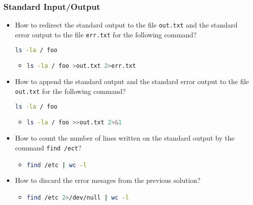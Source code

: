\begin{frame}[fragile]
\frametitle{Standard Input/Output}
	\begin{itemize}

		\item How to redirect the standard output to the file \texttt{out.txt} and 
			the standard error output to the file \texttt{err.txt} for the following command?
			
		\begin{small}	
\begin{lstlisting}[language=bash]		
ls -la / foo
\end{lstlisting}
		\end{small}		
		
		\begin{itemize}
			\item
\begin{lstlisting}[language=bash]		
ls -la / foo >out.txt 2>err.txt
\end{lstlisting}
		\end{itemize}

		\item How to append the standard output and the standard error output to the file \texttt{out.txt}  for the following command?
	
		\begin{small}		
\begin{lstlisting}[language=bash]		
ls -la / foo
\end{lstlisting}
		\end{small}	
		
		\begin{itemize}
			\item
\begin{lstlisting}[language=bash]		
ls -la / foo >>out.txt 2>&1
\end{lstlisting}
		\end{itemize}

		\item How to count the number of lines  written on the standard output by the command \texttt{find /ect}?	

		\begin{itemize}
			\item
\begin{lstlisting}[language=bash]		
find /etc | wc -l
\end{lstlisting}
		\end{itemize}

		\item How to discard the error mesages from the previous solution?
				
		\begin{itemize}
			\item
\begin{lstlisting}[language=bash]		
find /etc 2>/dev/null | wc -l
\end{lstlisting}
		\end{itemize}

	\end{itemize}
\end{frame}


